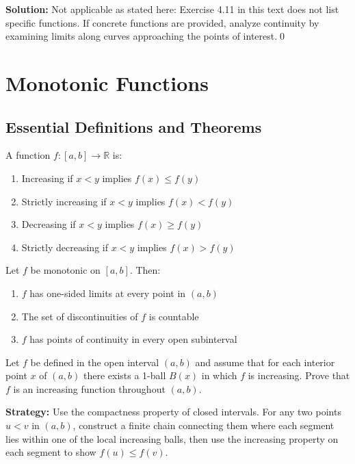 \bigskip\noindent\textbf{Solution:}
Not applicable as stated here: Exercise 4.11 in this text does not list specific functions. If concrete functions are provided, analyze continuity by examining limits along curves approaching the points of interest.\qed

\section{Monotonic Functions}

\subsection*{Essential Definitions and Theorems}

\begin{definition}
A function $f: [a,b] \to \mathbb{R}$ is:
\begin{enumerate}
\item Increasing if $x < y$ implies $f(x) \leq f(y)$
\item Strictly increasing if $x < y$ implies $f(x) < f(y)$
\item Decreasing if $x < y$ implies $f(x) \geq f(y)$
\item Strictly decreasing if $x < y$ implies $f(x) > f(y)$
\end{enumerate}
\end{definition}

\begin{theorem}
Let $f$ be monotonic on $[a,b]$. Then:
\begin{enumerate}
\item $f$ has one-sided limits at every point in $(a,b)$
\item The set of discontinuities of $f$ is countable
\item $f$ has points of continuity in every open subinterval
\end{enumerate}
\end{theorem}



\begin{problembox}
Let $f$ be defined in the open interval $(a, b)$ and assume that for each interior point $x$ of $(a, b)$ there exists a 1-ball $B(x)$ in which $f$ is increasing. Prove that $f$ is an increasing function throughout $(a, b)$.
\end{problembox}

\noindent\textbf{Strategy:} Use the compactness property of closed intervals. For any two points $u < v$ in $(a,b)$, construct a finite chain connecting them where each segment lies within one of the local increasing balls, then use the increasing property on each segment to show $f(u) \leq f(v)$.

